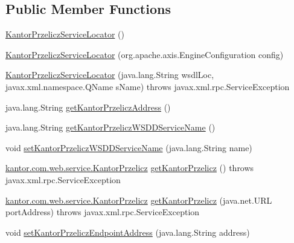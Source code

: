 \subsection*{Public Member Functions}
\begin{DoxyCompactItemize}
\item 
\hyperlink{classkantor_1_1com_1_1web_1_1service_1_1_kantor_przelicz_service_locator_a1daad1d7591d70469d27d2a17a23bbb7}{Kantor\+Przelicz\+Service\+Locator} ()
\item 
\hyperlink{classkantor_1_1com_1_1web_1_1service_1_1_kantor_przelicz_service_locator_a86b910ad4c4d10b13597322aac38493c}{Kantor\+Przelicz\+Service\+Locator} (org.\+apache.\+axis.\+Engine\+Configuration config)
\item 
\hyperlink{classkantor_1_1com_1_1web_1_1service_1_1_kantor_przelicz_service_locator_a7803c401349057b4dc9464bee871fef9}{Kantor\+Przelicz\+Service\+Locator} (java.\+lang.\+String wsdl\+Loc, javax.\+xml.\+namespace.\+Q\+Name s\+Name)  throws javax.\+xml.\+rpc.\+Service\+Exception 
\item 
java.\+lang.\+String \hyperlink{classkantor_1_1com_1_1web_1_1service_1_1_kantor_przelicz_service_locator_ac494431b6e486df99db8107de4eca1a3}{get\+Kantor\+Przelicz\+Address} ()
\item 
java.\+lang.\+String \hyperlink{classkantor_1_1com_1_1web_1_1service_1_1_kantor_przelicz_service_locator_a66dc7bbfd82ca24ca18cffd72885ba6d}{get\+Kantor\+Przelicz\+W\+S\+D\+D\+Service\+Name} ()
\item 
void \hyperlink{classkantor_1_1com_1_1web_1_1service_1_1_kantor_przelicz_service_locator_a66de37b1b0144707a5f1622624de454f}{set\+Kantor\+Przelicz\+W\+S\+D\+D\+Service\+Name} (java.\+lang.\+String name)
\item 
\hyperlink{classkantor_1_1com_1_1web_1_1service_1_1_kantor_przelicz}{kantor.\+com.\+web.\+service.\+Kantor\+Przelicz} \hyperlink{classkantor_1_1com_1_1web_1_1service_1_1_kantor_przelicz_service_locator_a3844af66601dcdb811a31551ce63df11}{get\+Kantor\+Przelicz} ()  throws javax.\+xml.\+rpc.\+Service\+Exception 
\item 
\hyperlink{classkantor_1_1com_1_1web_1_1service_1_1_kantor_przelicz}{kantor.\+com.\+web.\+service.\+Kantor\+Przelicz} \hyperlink{classkantor_1_1com_1_1web_1_1service_1_1_kantor_przelicz_service_locator_afc2877ff5ca919546dea693a43df2d94}{get\+Kantor\+Przelicz} (java.\+net.\+U\+R\+L port\+Address)  throws javax.\+xml.\+rpc.\+Service\+Exception 
\item 
void \hyperlink{classkantor_1_1com_1_1web_1_1service_1_1_kantor_przelicz_service_locator_a37bae52803b2f5b9d2dc94ac3567359c}{set\+Kantor\+Przelicz\+Endpoint\+Address} (java.\+lang.\+String address)

\end{DoxyCompactItemize}
